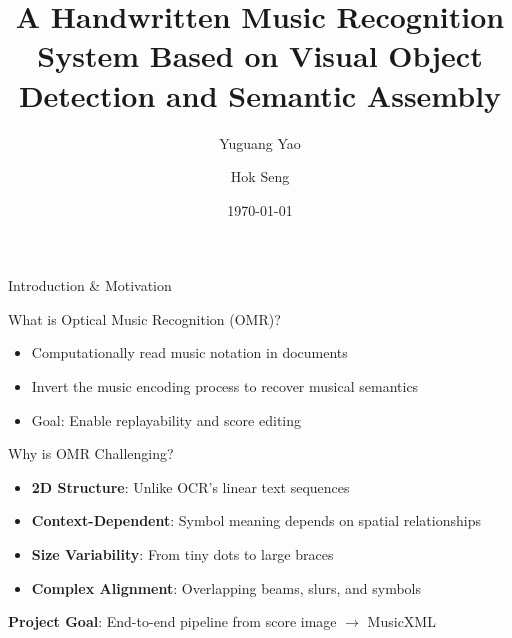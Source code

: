 \documentclass[aspectratio=169]{beamer}
\title{A Handwritten Music Recognition System Based on Visual Object Detection and Semantic Assembly}
\author{Yuguang Yao \and Hok Seng}
\date{\today}
\begin{document}
\frame{\titlepage}

\begin{frame}{Introduction \& Motivation}
    \begin{block}{What is Optical Music Recognition (OMR)?}
        \begin{itemize}
            \item Computationally read music notation in documents
            \item Invert the music encoding process to recover musical semantics
            \item Goal: Enable replayability and score editing
        \end{itemize}
    \end{block}
    
    \begin{block}{Why is OMR Challenging?}
        \begin{itemize}
            \item \textbf{2D Structure}: Unlike OCR's linear text sequences
            \item \textbf{Context-Dependent}: Symbol meaning depends on spatial relationships
            \item \textbf{Size Variability}: From tiny dots to large braces
            \item \textbf{Complex Alignment}: Overlapping beams, slurs, and symbols
        \end{itemize}
    \end{block}
    
    \vspace{0.3cm}
    \textbf{Project Goal}: End-to-end pipeline from score image $\rightarrow$ MusicXML
\end{frame}
\end{document}
